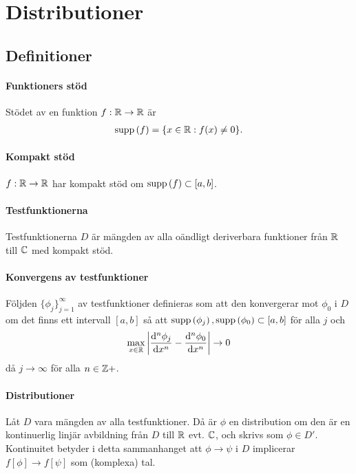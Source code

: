 \section{Distributioner}

\subsection{Definitioner}

\paragraph{Funktioners stöd}
Stödet av en funktion $f: \mathbb{R}\to\mathbb{R}$ är
\begin{align*}
	\text{supp}\left(f\right) = \{x\in\mathbb{R}: f(x)\neq 0\}.
\end{align*}

\paragraph{Kompakt stöd}
$f: \mathbb{R}\to\mathbb{R}$ har kompakt stöd om $\text{supp}\left(f\right)\subset [a, b]$.

\paragraph{Testfunktionerna}
Testfunktionerna $D$ är mängden av alla oändligt deriverbara funktioner från $\mathbb{R}$ till $\mathbb{C}$ med kompakt stöd.

\paragraph{Konvergens av testfunktioner}
Följden $\{\phi_{j}\}_{j = 1}^{\infty}$ av testfunktioner definieras som att den konvergerar mot $\phi_{0}$ i $D$ om det finns ett intervall $[a, b]$ så att $\text{supp}\left(\phi_{j}\right), \text{supp}\left(\phi_{0}\right)\subset [a, b]$ för alla $j$ och
\begin{align*}
	\max\limits_{x\in\mathbb{R}}\abs{\dv[n]{\phi_{j}}{x} (x) - \dv[n]{\phi_{0}}{x} (x)}\to 0
\end{align*}
då $j\to\infty$ för alla $n\in\mathbb{Z}{+}$.

\paragraph{Distributioner}
Låt $D$ vara mängden av alla testfunktioner. Då är $\phi$ en distribution om den är en kontinuerlig linjär avbildning från $D$ till $\mathbb{R}$ evt. $\mathbb{C}$, och skrivs som $\phi\in D'$. Kontinuitet betyder i detta sammanhanget att $\phi\to\psi$ i $D$ implicerar $f[\phi]\to f[\psi]$ som (komplexa) tal.

